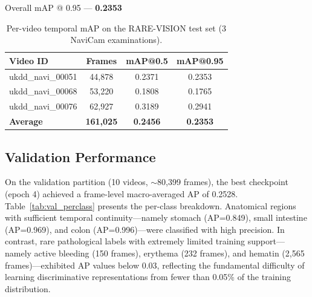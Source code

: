 \documentclass[12pt]{article}
\begin{document}
\noindent Overall mAP @ 0.95 --- \textbf{0.2353}

\vspace{2mm}

\begin{table}[htbp]
\centering
\caption{Per-video temporal mAP on the RARE-VISION test set (3 NaviCam examinations).}
\label{tab:per_video}
\begin{tabular}{lccc}
\toprule
\textbf{Video ID} & \textbf{Frames} & \textbf{mAP@0.5} & \textbf{mAP@0.95} \\
\midrule
ukdd\_navi\_00051 & 44,878 & 0.2371 & 0.2353 \\
ukdd\_navi\_00068 & 53,220 & 0.1808 & 0.1765 \\
ukdd\_navi\_00076 & 62,927 & 0.3189 & 0.2941 \\
\midrule
\textbf{Average} & \textbf{161,025} & \textbf{0.2456} & \textbf{0.2353} \\
\bottomrule
\end{tabular}
\end{table}

\subsection{Validation Performance}

On the validation partition (10 videos, $\sim$80,399 frames), the best checkpoint (epoch 4) achieved a frame-level macro-averaged AP of 0.2528. Table~\ref{tab:val_perclass} presents the per-class breakdown. Anatomical regions with sufficient temporal continuity—namely stomach (AP=0.849), small intestine (AP=0.969), and colon (AP=0.996)—were classified with high precision. In contrast, rare pathological labels with extremely limited training support—namely active bleeding (150 frames), erythema (232 frames), and hematin (2,565 frames)—exhibited AP values below 0.03, reflecting the fundamental difficulty of learning discriminative representations from fewer than 0.05\% of the training distribution.
\end{document}
